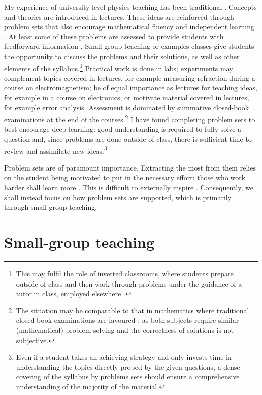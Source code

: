 My experience of university-level physics teaching has been traditional \citep[cf.][]{Iannone2015}. Concepts and theories are introduced in lectures. These ideas are reinforced through problem sets that also encourage mathematical fluency and independent learning \citep{Pike2015}. At least some of these problems are assessed to provide students with feedforward information \citep{Bloxham2015}. Small-group teaching or examples classes give students the opportunity to discuss the problems and their solutions, as well as other elements of the syllabus.\footnote{This may fulfil the role of inverted classrooms, where students prepare outside of class and then work through problems under the guidance of a tutor in class, employed elsewhere \citep{Lage2000}.} Practical work is done in labs; experiments may complement topics covered in lectures, for example measuring refraction during a course on electromagnetism; be of equal importance as lectures for teaching ideas, for example in a course on electronics, or motivate material covered in lectures, for example error analysis. Assessment is dominated by summative closed-book examinations at the end of the courses.\footnote{The situation may be comparable to that in mathematics where traditional closed-book examinations are favoured \citep{Iannone2014}, as both subjects require similar (mathematical) problem solving and the correctness of solutions is not subjective.} I have found completing problem sets to best encourage deep learning: good understanding is required to fully solve a question and, since problems are done outside of class, there is sufficient time to review and assimilate new ideas.\footnote{Even if a student takes an achieving strategy \citep[chapter 2]{Biggs1987} and only invests time in understanding the topics directly probed by the given questions, a dense covering of the syllabus by problems sets should ensure a comprehensive understanding of the majority of the material.}

Problem sets are of paramount importance. Extracting the most from them relies on the student being motivated to put in the necessary effort: those who work harder shall learn more \citep{Gibbs2015}. This is difficult to externally inspire \citep[cf.][]{Ryan2000}. Consequently, we shall instead focus on how problem sets are supported, which is primarily through small-group teaching.

\section{Small-group teaching}\label{sec:small}

